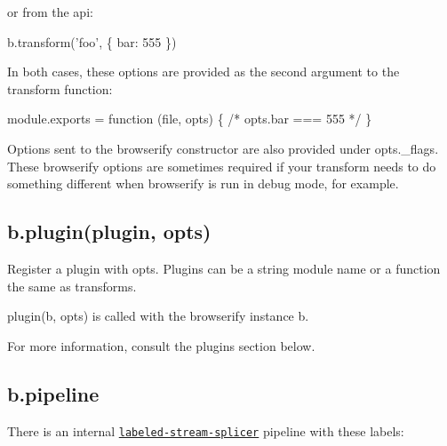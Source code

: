 or from the api\+:


\begin{DoxyCode}
b.transform('foo', \{ bar: 555 \})
\end{DoxyCode}


In both cases, these options are provided as the second argument to the transform function\+:


\begin{DoxyCode}
module.exports = function (file, opts) \{ /* opts.bar === 555 */ \}
\end{DoxyCode}


Options sent to the browserify constructor are also provided under {\ttfamily opts.\+\_\+flags}. These browserify options are sometimes required if your transform needs to do something different when browserify is run in debug mode, for example.

\subsection*{b.\+plugin(plugin, opts)}

Register a {\ttfamily plugin} with {\ttfamily opts}. Plugins can be a string module name or a function the same as transforms.

{\ttfamily plugin(b, opts)} is called with the browserify instance {\ttfamily b}.

For more information, consult the plugins section below.

\subsection*{b.\+pipeline}

There is an internal \href{https://www.npmjs.com/package/labeled-stream-splicer}{\tt labeled-\/stream-\/splicer} pipeline with these labels\+:


